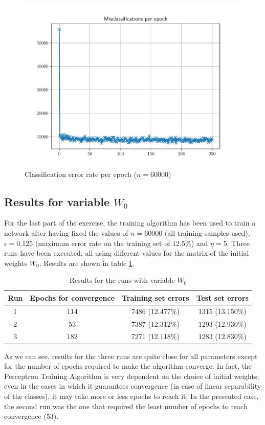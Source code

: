 \documentclass[letterpaper,headings=standardclasses]{scrartcl}
\begin{document}
\begin{figure}[h]
\centering
\includegraphics[width=.7\linewidth]{errors_60000.pdf}
\caption{Classification error rate per epoch ($n = 60000$)}
\label{errors_60000}
\end{figure}

\subsection{Results for variable $W_0$}

For the last part of the exercise, the training algorithm has been used to train a network after having fixed the values of $n = 60000$ (all training samples used), $\epsilon = 0.125$ (maximum error rate on the training set of 12.5\%) and $\eta = 5$. Three runs have been executed, all using different values for the matrix of the initial weights $W_0$. Results are shown in table \ref{results_varw}.

\begin{table}[h]
\centering
\begin{tabular}{|c|c|c|c|}
\hline
Run   & Epochs for convergence & Training set errors & Test set errors \\ \hline
1     & 114 & 7486 (12.477\%) & 1315 (13.150\%) \\ \hline
2     & 53  & 7387 (12.312\%) & 1293 (12.930\%) \\ \hline
3     & 182 & 7271 (12.118\%) & 1283 (12.830\%) \\ \hline
\end{tabular}
\caption{Results for the runs with variable $W_0$}
\label{results_varw}
\end{table}

As we can see, results for the three runs are quite close for all parameters except for the number of epochs required to make the algorithm converge. In fact, the Perceptron Training Algorithm is very dependent on the choice of initial weights; even in the cases in which it guarantees convergence (in case of linear separability of the classes), it may take more or less epochs to reach it. In the presented case, the second run was the one that required the least number of epochs to reach convergence (53).
\end{document}
